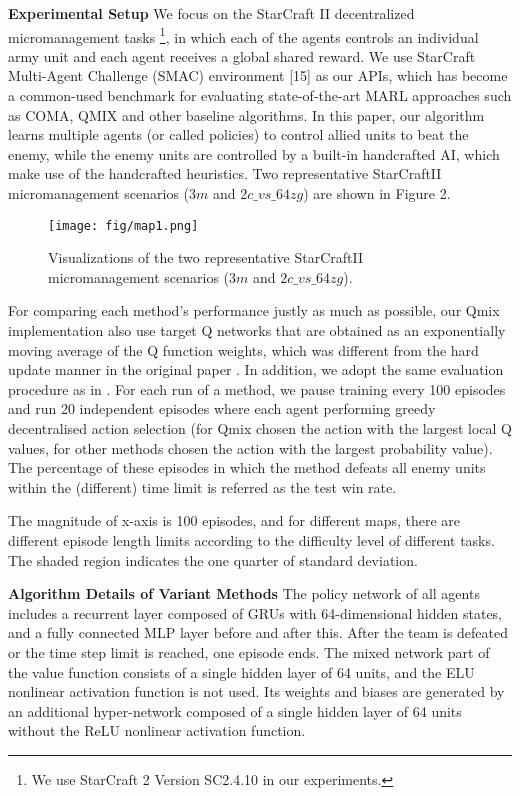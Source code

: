 \documentclass[runningheads]{llncs}
\begin{document}
{\bf Experimental Setup}
We focus on the StarCraft II decentralized micromanagement tasks \cite{b13} \footnote{We use StarCraft 2 Version SC2.4.10 in our experiments.}, in which each of the agents controls an individual army unit and each agent receives a global shared reward. We use StarCraft Multi-Agent Challenge (SMAC) environment [15] as our APIs, which has become
a common-used benchmark for evaluating state-of-the-art MARL approaches such as COMA, QMIX and other baseline algorithms. In this paper, our algorithm learns multiple agents (or called policies) to control allied units to beat the
enemy, while the enemy units are controlled by a built-in handcrafted AI, which make use of the handcrafted heuristics. 
Two representative StarCraftII micromanagement
scenarios ($3m$ and $2c\_vs\_64zg$) are shown in Figure 2.
\begin{figure}[h]
	\centering
	\texttt{[image: fig/map1.png]} 
\caption{Visualizations of the two representative StarCraftII micromanagement scenarios ($3m$ and $2c\_vs\_64zg$).}
	\label{wolf2}
\end{figure}













For comparing each method’s performance justly as much as possible, our Qmix implementation also use target Q networks that are obtained as an exponentially moving average of the Q function weights, which was different from the hard update manner in the original paper \cite{b7}. 
In addition, we adopt the same evaluation procedure as in  \cite{b7}. For each run of a method, we pause training every 100 episodes and run 20 independent episodes where each agent performing greedy decentralised action selection (for Qmix chosen the action with the largest local Q values, for other methods chosen the action with the largest probability value). The percentage of these episodes in which the method defeats all enemy units within the (different) time limit is referred as the test win rate.

The magnitude of x-axis is 100 episodes, and for different maps, there are different episode length limits according to the difficulty level of different tasks. The shaded region indicates the one  quarter of standard deviation.

{\bf Algorithm Details of Variant Methods}
The policy network of all agents includes a recurrent layer composed of GRUs with 64-dimensional hidden states, and a fully connected MLP layer before and after this. After the team is defeated or the time step limit is reached, one episode ends.
 The mixed network part of the value function consists of a single hidden layer of 64 units, and the ELU nonlinear activation function is not used. Its weights and biases are generated by an additional hyper-network composed of a single hidden layer of 64 units without the ReLU nonlinear activation function.
 
\end{document}
